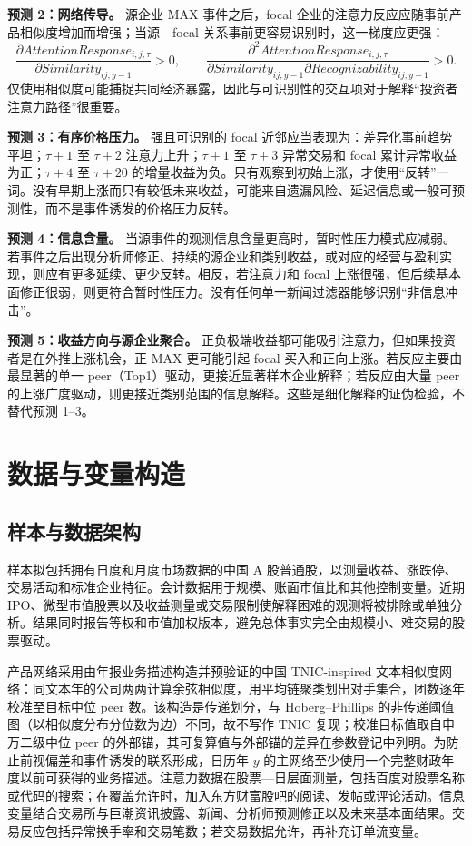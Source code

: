 \documentclass[UTF8,a4paper,11pt]{ctexart}
\begin{document}
\textbf{预测 2：网络传导。} 源企业 MAX 事件之后，focal 企业的注意力反应应随事前产品相似度增加而增强；当源—focal 关系事前更容易识别时，这一梯度应更强：
\[
\frac{\partial AttentionResponse_{i,j,\tau}}{\partial Similarity_{ij,y-1}}>0,
\qquad
\frac{\partial^2 AttentionResponse_{i,j,\tau}}
{\partial Similarity_{ij,y-1}\partial Recognizability_{ij,y-1}}>0.
\]
仅使用相似度可能捕捉共同经济暴露，因此与可识别性的交互项对于解释“投资者注意力路径”很重要。

\textbf{预测 3：有序价格压力。} 强且可识别的 focal 近邻应当表现为：差异化事前趋势平坦；$\tau+1$ 至 $\tau+2$ 注意力上升；$\tau+1$ 至 $\tau+3$ 异常交易和 focal 累计异常收益为正；$\tau+4$ 至 $\tau+20$ 的增量收益为负。只有观察到初始上涨，才使用“反转”一词。没有早期上涨而只有较低未来收益，可能来自遗漏风险、延迟信息或一般可预测性，而不是事件诱发的价格压力反转。

\textbf{预测 4：信息含量。} 当源事件的观测信息含量更高时，暂时性压力模式应减弱。若事件之后出现分析师修正、持续的源企业和类别收益，或对应的经营与盈利实现，则应有更多延续、更少反转。相反，若注意力和 focal 上涨很强，但后续基本面修正很弱，则更符合暂时性压力。没有任何单一新闻过滤器能够识别“非信息冲击”。

\textbf{预测 5：收益方向与源企业聚合。} 正负极端收益都可能吸引注意力，但如果投资者是在外推上涨机会，正 MAX 更可能引起 focal 买入和正向上涨。若反应主要由最显著的单一 peer（Top1）驱动，更接近显著样本企业解释；若反应由大量 peer 的上涨广度驱动，则更接近类别范围的信息解释。这些是细化解释的证伪检验，不替代预测 1--3。

\section{数据与变量构造}
\subsection{样本与数据架构}
样本拟包括拥有日度和月度市场数据的中国 A 股普通股，以测量收益、涨跌停、交易活动和标准企业特征。会计数据用于规模、账面市值比和其他控制变量。近期 IPO、微型市值股票以及收益测量或交易限制使解释困难的观测将被排除或单独分析。结果同时报告等权和市值加权版本，避免总体事实完全由规模小、难交易的股票驱动。

产品网络采用由年报业务描述构造并预验证的中国 TNIC-inspired 文本相似度网络：同文本年的公司两两计算余弦相似度，用平均链聚类划出对手集合，团数逐年校准至目标中位 peer 数。该构造是传递划分，与 Hoberg--Phillips 的非传递阈值图（以相似度分布分位数为边）不同，故不写作 TNIC 复现；校准目标值取自申万二级中位 peer 的外部锚，其可复算值与外部锚的差异在参数登记中列明。为防止前视偏差和事件诱发的联系形成，日历年 $y$ 的主网络至少使用一个完整财政年度以前可获得的业务描述。注意力数据在股票—日层面测量，包括百度对股票名称或代码的搜索；在覆盖允许时，加入东方财富股吧的阅读、发帖或评论活动。信息变量结合交易所与巨潮资讯披露、新闻、分析师预测修正以及未来基本面结果。交易反应包括异常换手率和交易笔数；若交易数据允许，再补充订单流变量。
\end{document}
